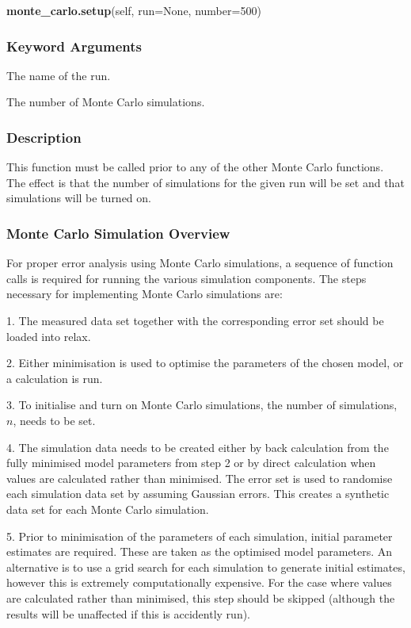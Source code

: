 \textsf{\textbf{monte\_carlo.setup}(self, run=None, number=500)}


\subsubsection{Keyword Arguments}


  The name of the run.

  The number of Monte Carlo simulations.

\subsubsection{Description}

This function must be called prior to any of the other Monte Carlo functions.  The effect is
that the number of simulations for the given run will be set and that simulations will be
turned on.



\subsubsection{Monte Carlo Simulation Overview}

For proper error analysis using Monte Carlo simulations, a sequence of function calls is
required for running the various simulation components.  The steps necessary for
implementing Monte Carlo simulations are:

1.  The measured data set together with the corresponding error set should be loaded into
relax.

2.  Either minimisation is used to optimise the parameters of the chosen model, or a
calculation is run.

3.  To initialise and turn on Monte Carlo simulations, the number of simulations, $n$, needs
to be set.

4.  The simulation data needs to be created either by back calculation from the fully
minimised model parameters from step 2 or by direct calculation when values are calculated
rather than minimised.  The error set is used to randomise each simulation data set by
assuming Gaussian errors.  This creates a synthetic data set for each Monte Carlo
simulation.

5.  Prior to minimisation of the parameters of each simulation, initial parameter estimates
are required.  These are taken as the optimised model parameters.  An alternative is to use
a grid search for each simulation to generate initial estimates, however this is extremely
computationally expensive.  For the case where values are calculated rather than minimised,
this step should be skipped (although the results will be unaffected if this is accidently
run).

